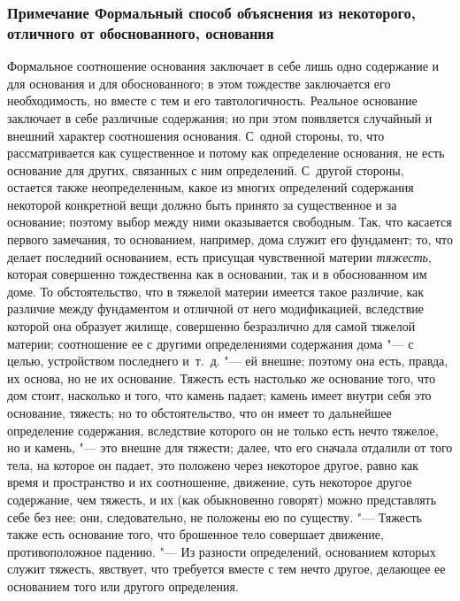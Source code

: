 \subsubsection[Примечание Формальный способ объяснения из некоторого, отличного от обоснованного, основания]
{Примечание Формальный способ объяснения из некоторого, отличного от обоснованного, основания}

Формальное соотношение основания заключает в себе лишь одно содержание и для
основания и для обоснованного; в этом тождестве заключается его
необходимость, но вместе с тем и его тавтологичность. Реальное основание
заключает в себе различные содержания; но при этом появляется случайный и
внешний характер соотношения основания. С~одной стороны, то, что
рассматривается как существенное и потому как определение основания, не
есть основание для других, связанных с ним определений. С~другой стороны,
остается также неопределенным, какое из многих определений содержания
некоторой конкретной вещи должно быть принято за существенное и за
основание; поэтому выбор между ними оказывается свободным. Так, что
касается первого замечания, то основанием, например, дома служит его
фундамент; то, что делает последний основанием, есть присущая чувственной
материи {\em тяжесть}, которая совершенно тождественна
как в основании, так и в обоснованном им доме. То обстоятельство, что в
тяжелой материи имеется такое различие, как различие между фундаментом и
отличной от него модификацией, вследствие которой она образует жилище,
совершенно безразлично для самой тяжелой материи; соотношение ее с другими
определениями содержания дома "--- с целью,
устройством последнего и~т.~д. "--- ей
внешне; поэтому она есть, правда, их основа, но не их основание. Тяжесть
есть настолько же основание того, что дом стоит, насколько и того, что
камень падает; камень имеет внутри себя это основание, тяжесть; но то
обстоятельство, что он имеет то дальнейшее определение содержания,
вследствие которого он не только есть нечто тяжелое, но и камень, "--- это
внешне для тяжести; далее, что его сначала отдалили от того тела, на
которое он падает, это положено через некоторое другое, равно как время и
пространство и их соотношение, движение, суть некоторое другое содержание,
чем тяжесть, и их (как обыкновенно говорят) можно представлять себе без
нее; они, следовательно, не положены ею по существу. "--- Тяжесть также есть
основание того, что брошенное тело совершает движение, противоположное
падению. "--- Из разности определений, основанием которых служит тяжесть,
явствует, что требуется вместе с тем нечто другое, делающее ее основанием
того или другого определения.

